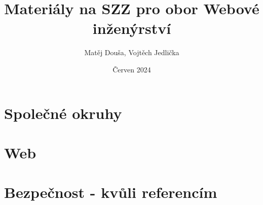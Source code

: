 \documentclass{article}
\title{Materiály na SZZ pro obor Webové inženýrství}
\author{Matěj Douša, Vojtěch Jedlička}
\date{Červen 2024}
\begin{document}
\maketitle

\tableofcontents

\newpage
\section{Společné okruhy}

\newpage

\newpage

\newpage

\newpage

\newpage

\newpage

\newpage

\newpage

\newpage

\newpage

\newpage

\newpage

\newpage

\newpage

\newpage

\newpage

\newpage

\newpage

\newpage

\newpage

\newpage

\newpage

\newpage

\newpage

\newpage

\newpage

\newpage

\newpage

\newpage

\newpage

\newpage
\section{Web}

\newpage

\newpage

\newpage

\newpage

\newpage

\newpage

\newpage

\newpage

\newpage

\newpage

\newpage

\newpage

\newpage

\newpage

\newpage

\newpage

\newpage


\newpage
\section{Bezpečnost - kvůli referencím}

\newpage

\newpage

\newpage

\newpage

\newpage

\newpage

\newpage

\newpage

\newpage

\newpage

\newpage

\newpage

\newpage

\newpage

\newpage

\newpage

\newpage

\newpage

\newpage

\newpage

\newpage

\newpage

\newpage

\newpage

\newpage

\end{document}

